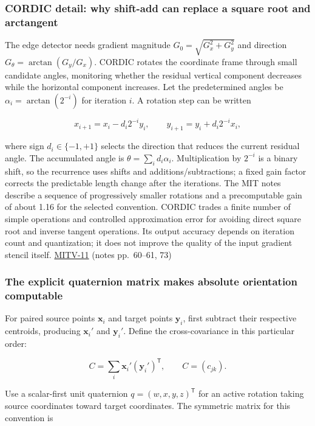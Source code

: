 \subsubsection{CORDIC detail: why shift-add can replace a square root and arctangent}\label{cordic-detail-why-shift-add-can-replace-a-square-root-and-arctangent}

The edge detector needs gradient magnitude \(G_0=\sqrt{G_x^2+G_y^2}\) and direction \(G_\theta=\arctan(G_y/G_x)\). CORDIC rotates the coordinate frame through small candidate angles, monitoring whether the residual vertical component decreases while the horizontal component increases. Let the predetermined angles be \(\alpha_i=\arctan(2^{-i})\) for iteration \(i\). A rotation step can be written

\[
x_{i+1}=x_i-d_i2^{-i}y_i,\qquad y_{i+1}=y_i+d_i2^{-i}x_i,
\]

where sign \(d_i\in\{-1,+1\}\) selects the direction that reduces the current residual angle. The accumulated angle is \(\theta=\sum_i d_i\alpha_i\). Multiplication by \(2^{-i}\) is a binary shift, so the recurrence uses shifts and additions/subtractions; a fixed gain factor corrects the predictable length change after the iterations. The MIT notes describe a sequence of progressively smaller rotations and a precomputable gain of about 1.16 for the selected convention. CORDIC trades a finite number of simple operations and controlled approximation error for avoiding direct square root and inverse tangent operations. Its output accuracy depends on iteration count and quantization; it does not improve the quality of the input gradient stencil itself. \hyperref[04-visual-computing-ii-ch036]{MITV-11} (notes pp.~60--61, 73)

\subsubsection{The explicit quaternion matrix makes absolute orientation computable}\label{the-explicit-quaternion-matrix-makes-absolute-orientation-computable}

For paired source points \(\mathbf x_i\) and target points \(\mathbf y_i\), first subtract their respective centroids, producing \(\mathbf x_i'\) and \(\mathbf y_i'\). Define the cross-covariance in this particular order:

\[
C=\sum_i\mathbf x_i'(\mathbf y_i')^{\mathsf T},\qquad C=(c_{jk}).
\]

Use a scalar-first unit quaternion \(q=(w,x,y,z)^{\mathsf T}\) for an active rotation taking source coordinates toward target coordinates. The symmetric matrix for this convention is

